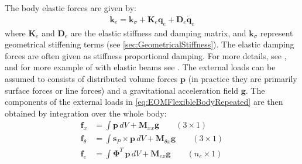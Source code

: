 \documentclass[wes, manuscript]{copernicus}
\renewcommand{\v}[1]{\boldsymbol{#1}}
\newcommand{\m}[1]{\boldsymbol{#1}}
\begin{document}
% 
The body elastic forces are given by:
\begin{align}
  \v{k}_e =  \v{k}_\sigma + \m{K}_e \v{q}_e  + \m{D}_e \v{\dot{q}}_e     %
\end{align}
where $\m{K}_e$ and $\m{D}_e$ are the elastic stiffness and damping matrix, and $\v{k}_\sigma$ represent geometrical stiffening terms (see \autoref{sec:GeometricalStiffness}). 
The elastic damping forces are often given as stiffness proportional damping.
For more details, see \cite{Wallrapp:1994}, and for more example of with elastic beams see \cite{branlard:2019flex}.
% 
The external loads can be assumed to consists of distributed volume forces $\v{p}$ (in practice they are primarily surface forces or line forces) and a gravitational acceleration field $\v{g}$.
The components of the external loads  in  \autoref{eq:EOMFlexibleBodyRepeated} are then obtained by integration over the whole body:
\begin{align}
    \v{f}_x&=\int \v{p} \, dV
        + \m{M}_{xx}\v{g}
        \qquad (3\times 1)
            \label{eq:genQgeneral}
    \\
    \v{f}_\theta&=\int \v{s}_P\times\v{p} \, dV
        + \m{M}_{\theta x}\v{g}
        \qquad (3\times 1)
    \\
    \v{f}_e&=\int {\m{\Phi}}^T\, \v{p} \, dV
        + \m{M}_{e x}\v{g}
        \qquad (n_e\times 1)
\end{align}



\end{document}
